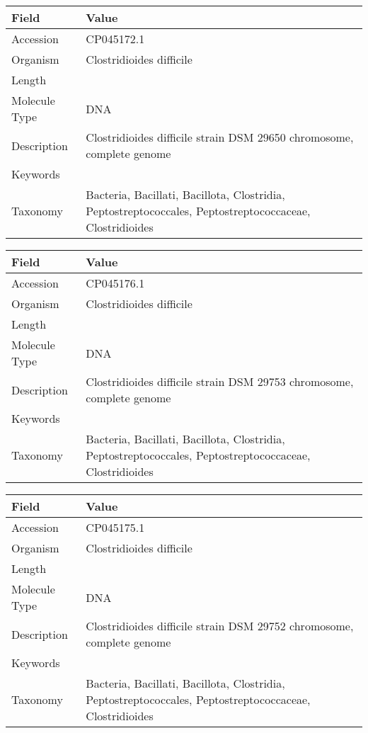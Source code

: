 \documentclass[10pt]{article}
\begin{document}
\vspace{1em}
{\footnotesize
\begin{longtable}{>{\raggedright\arraybackslash}p{4.5cm} >{\raggedright\arraybackslash}p{11.5cm}}
\textbf{Field} & \textbf{Value} \\
\hline
Accession & CP045172.1 \\
Organism & Clostridioides difficile \\
Length & 3931260 \\
Molecule Type & DNA \\
Description & Clostridioides difficile strain DSM 29650 chromosome, complete genome \\
Keywords &  \\
Taxonomy & Bacteria, Bacillati, Bacillota, Clostridia, Peptostreptococcales, Peptostreptococcaceae, Clostridioides \\
\end{longtable}
}

\vspace{1em}
{\footnotesize
\begin{longtable}{>{\raggedright\arraybackslash}p{4.5cm} >{\raggedright\arraybackslash}p{11.5cm}}
\textbf{Field} & \textbf{Value} \\
\hline
Accession & CP045176.1 \\
Organism & Clostridioides difficile \\
Length & 4071599 \\
Molecule Type & DNA \\
Description & Clostridioides difficile strain DSM 29753 chromosome, complete genome \\
Keywords &  \\
Taxonomy & Bacteria, Bacillati, Bacillota, Clostridia, Peptostreptococcales, Peptostreptococcaceae, Clostridioides \\
\end{longtable}
}

\vspace{1em}
{\footnotesize
\begin{longtable}{>{\raggedright\arraybackslash}p{4.5cm} >{\raggedright\arraybackslash}p{11.5cm}}
\textbf{Field} & \textbf{Value} \\
\hline
Accession & CP045175.1 \\
Organism & Clostridioides difficile \\
Length & 4071592 \\
Molecule Type & DNA \\
Description & Clostridioides difficile strain DSM 29752 chromosome, complete genome \\
Keywords &  \\
Taxonomy & Bacteria, Bacillati, Bacillota, Clostridia, Peptostreptococcales, Peptostreptococcaceae, Clostridioides \\
\end{longtable}
}
\end{document}
